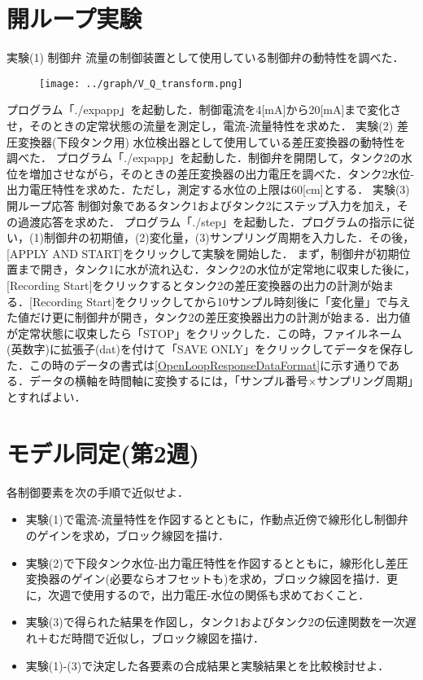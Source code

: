 \documentclass[12pt]{jsarticle}
\begin{document}
\section{開ループ実験}
{\LARGE 実験(1) 制御弁}
流量の制御装置として使用している制御弁の動特性を調べた．
\begin{figure}[tb]
  \begin{center}
    \texttt{[image: ../graph/V\_Q\_transform.png]}
    \caption{}
    \label{V_Q_transform}
  \end{center}
\end{figure}
プログラム「./expapp」を起動した．制御電流を4[mA]から20[mA]まで変化させ，そのときの定常状態の流量を測定し，電流-流量特性を求めた．
{\LARGE 実験(2) 差圧変換器(下段タンク用)}
水位検出器として使用している差圧変換器の動特性を調べた．
プログラム「./expapp」を起動した．制御弁を開閉して，タンク2の水位を増加させながら，そのときの差圧変換器の出力電圧を調べた．タンク2水位-出力電圧特性を求めた．ただし，測定する水位の上限は60[cm]とする．
{\LARGE 実験(3) 開ループ応答}
制御対象であるタンク1およびタンク2にステップ入力を加え，その過渡応答を求めた．
プログラム「./step」を起動した．プログラムの指示に従い，(1)制御弁の初期値，(2)変化量，(3)サンプリング周期を入力した．その後，[APPLY AND START]をクリックして実験を開始した．
まず，制御弁が初期位置まで開き，タンク1に水が流れ込む．タンク2の水位が定常地に収束した後に，[Recording Start]をクリックするとタンク2の差圧変換器の出力の計測が始まる．[Recording Start]をクリックしてから10サンプル時刻後に「変化量」で与えた値だけ更に制御弁が開き，タンク2の差圧変換器出力の計測が始まる．出力値が定常状態に収束したら「STOP」をクリックした．この時，ファイルネーム(英数字)に拡張子(dat)を付けて「SAVE ONLY」をクリックしてデータを保存した．この時のデータの書式は\ref{OpenLoopResponseDataFormat}に示す通りである．データの横軸を時間軸に変換するには，「サンプル番号×サンプリング周期」とすればよい．
\section{モデル同定(第2週)}
各制御要素を次の手順で近似せよ．
\begin{itemize}
\item 実験(1)で電流-流量特性を作図するとともに，作動点近傍で線形化し制御弁のゲインを求め，ブロック線図を描け．
\item 実験(2)で下段タンク水位-出力電圧特性を作図するとともに，線形化し差圧変換器のゲイン(必要ならオフセットも)を求め，ブロック線図を描け．更に，次週で使用するので，出力電圧-水位の関係も求めておくこと．
\item 実験(3)で得られた結果を作図し，タンク1およびタンク2の伝達関数を一次遅れ＋むだ時間で近似し，ブロック線図を描け．
\item 実験(1)-(3)で決定した各要素の合成結果と実験結果とを比較検討せよ．
\end{itemize}
\end{document}
